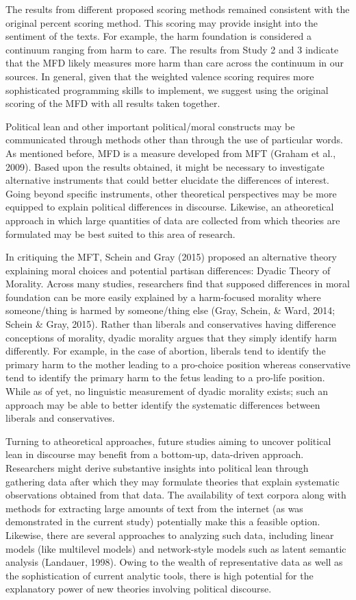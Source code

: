 \documentclass[
  man,floatsintext]{apa6}
\begin{document}
The results from different proposed scoring methods remained consistent with the original percent scoring method. This scoring may provide insight into the sentiment of the texts. For example, the harm foundation is considered a continuum ranging from harm to care. The results from Study 2 and 3 indicate that the MFD likely measures more harm than care across the continuum in our sources. In general, given that the weighted valence scoring requires more sophisticated programming skills to implement, we suggest using the original scoring of the MFD with all results taken together.

Political lean and other important political/moral constructs
may be communicated through methods other than through the use of
particular words. As mentioned before, MFD is a measure developed from
MFT (Graham et al., 2009). Based upon the results obtained, it might be
necessary to investigate alternative instruments that could better
elucidate the differences of interest. Going beyond specific
instruments, other theoretical perspectives may be more equipped to
explain political differences in discourse. Likewise, an atheoretical
approach in which large quantities of data are collected from which
theories are formulated may be best suited to this area of research.

In critiquing the MFT, Schein and Gray (2015) proposed an alternative theory explaining
moral choices and potential partisan differences: Dyadic Theory of
Morality. Across many studies, researchers find that supposed
differences in moral foundation can be more easily explained by a
harm-focused morality where someone/thing is harmed by someone/thing
else (Gray, Schein, \& Ward, 2014; Schein \& Gray, 2015). Rather than liberals and conservatives
having difference conceptions of morality, dyadic morality argues that
they simply identify harm differently. For example, in the case of
abortion, liberals tend to identify the primary harm to the mother
leading to a pro-choice position whereas conservative tend to identify
the primary harm to the fetus leading to a pro-life position. While as
of yet, no linguistic measurement of dyadic morality exists; such an
approach may be able to better identify the systematic differences
between liberals and conservatives.

Turning to atheoretical approaches, future studies aiming to uncover
political lean in discourse may benefit from a bottom-up, data-driven
approach. Researchers might derive substantive insights into political
lean through gathering data after which they may formulate theories that
explain systematic observations obtained from that data. The
availability of text corpora along with methods for extracting large
amounts of text from the internet (as was demonstrated in the current
study) potentially make this a feasible option. Likewise, there are
several approaches to analyzing such data, including linear models (like
multilevel models) and network-style models such as latent semantic
analysis (Landauer, 1998). Owing to the wealth of representative data as
well as the sophistication of current analytic tools, there is high
potential for the explanatory power of new theories involving political
discourse.
\end{document}
